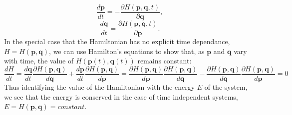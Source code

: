 \begin{equation}
\frac{d \bm{p}}{dt} =-\frac{\partial H(\bm{p},\bm{q},t)}{\partial \bm{q}},
\label{eq:pdot_hamil}

\end{equation}
\begin{equation}
\frac{d \bm{q}}{dt} =\frac{\partial H(\bm{p},\bm{q},t)}{\partial \bm{p}}.
\label{eq:qdot_hamil}
\end{equation}
In the special case that the Hamiltonian has no explicit time dependance, $H=H(\bm{p},\bm{q})$, we can use Hamilton's equations to show that, as $\bm{p}$ and $\bm{q}$ vary with time, the value of $H(\bm{p}(t),\bm{q}(t))$ remains constant:
\begin{equation*}
\frac{dH}{dt}=\frac{d\bm{q}}{dt}\frac{\partial H(\bm{p},\bm{q})}{d\bm{q}}+\frac{d\bm{p}}{dt}\frac{\partial H(\bm{p},\bm{q})}{d\bm{p}}=\frac{\partial H(\bm{p},\bm{q})}{d\bm{p}}\frac{\partial H(\bm{p},\bm{q})}{d\bm{q}}-\frac{\partial H(\bm{p},\bm{q})}{d\bm{q}}\frac{\partial H(\bm{p},\bm{q})}{d\bm{p}}=0
\end{equation*}
Thus identifying the value of the Hamiltonian with the energy $E$ of the system, we see that the energy is conserved in the case of time independent systems, $E=H(\bm{p},\bm{q})=constant$\cite{ottChaosDynamicalSystems2002}.\par

